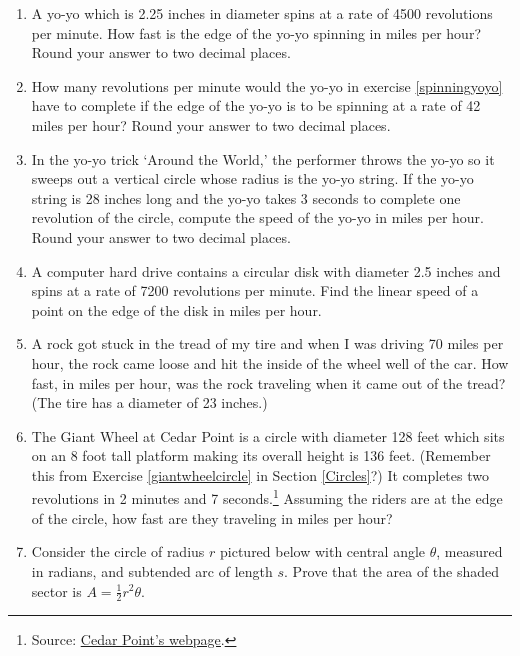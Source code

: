 \documentclass{ximera}
\begin{document}
\begin{enumerate}

\setcounter{enumi}{\value{HW}}

\item  \label{spinningyoyo} A yo-yo which is 2.25 inches in diameter spins at a rate of 4500 revolutions per minute.  How fast is the edge of the yo-yo spinning in miles per hour?  Round your answer to two decimal places.

\item  How many revolutions per minute would the yo-yo in exercise \ref{spinningyoyo} have to complete if the edge of the yo-yo is to be spinning at a rate of 42 miles per hour?  Round your answer to two decimal places.

\item  \label{yoyotrick} In the yo-yo trick `Around the World,' the performer throws the yo-yo so it sweeps out a vertical circle whose radius is the yo-yo string. If the yo-yo string is 28 inches long and the yo-yo takes 3 seconds to complete one revolution of the circle, compute the speed of the yo-yo in miles per hour.  Round your answer to two decimal places.

\item A computer hard drive contains a circular disk with diameter 2.5 inches and spins at a rate of 7200 revolutions per minute.  Find the linear speed of a point on the edge of the disk in miles per hour. \label{harddrive} 

\item A rock got stuck in the tread of my tire and when I was driving 70 miles per hour, the rock came loose and hit the inside of the wheel well of the car.  How fast, in miles per hour, was the rock traveling when it came out of the tread?  (The tire has a diameter of 23 inches.)

\item The Giant Wheel at Cedar Point is a circle with diameter 128 feet which sits on an 8 foot tall platform making its overall height is 136 feet.  (Remember this from Exercise \ref{giantwheelcircle} in Section \ref{Circles}?)  It completes two revolutions in 2 minutes and 7 seconds.\footnote{Source: \href{http://www.cedarpoint.com/public/park/rides/tranquil/giant_wheel.cfm}{\underline{Cedar Point's webpage}}.}  Assuming the riders are at the edge of the circle, how fast are they traveling in miles per hour?
\label{giantwheelmotion}

\item  Consider the circle of radius $r$ pictured below with central angle $\theta$, measured in radians,  and subtended arc of length $s$.  Prove that the area of the shaded sector is $A = \frac{1}{2} r^{2} \theta$. 


\end{enumerate}
\end{document}

